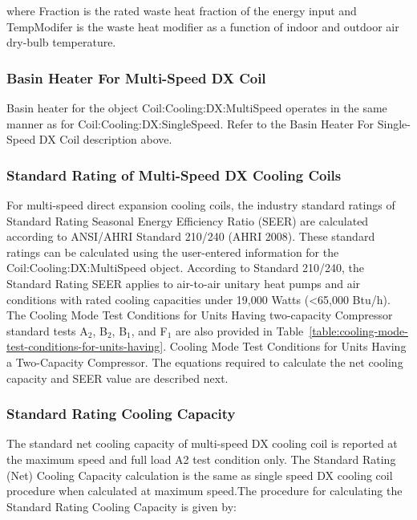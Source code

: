where Fraction is the rated waste heat fraction of the energy input and TempModifer is the waste heat modifier as a function of indoor and outdoor air dry-bulb temperature.

\subsubsection{Basin Heater For Multi-Speed DX Coil}\label{basin-heater-for-multi-speed-dx-coil}

Basin heater for the object Coil:Cooling:DX:MultiSpeed operates in the same manner as for Coil:Cooling:DX:SingleSpeed. Refer to the Basin Heater For Single-Speed DX Coil description above.

\subsubsection{Standard Rating of Multi-Speed DX Cooling Coils}\label{standard-rating-of-multi-speed-dx-cooling-coils}

For multi-speed direct expansion cooling coils, the industry standard ratings of Standard Rating Seasonal Energy Efficiency Ratio (SEER) are calculated according to ANSI/AHRI Standard 210/240 (AHRI 2008). These standard ratings can be calculated using the user-entered information for the Coil:Cooling:DX:MultiSpeed object. According to Standard 210/240, the Standard Rating SEER applies to air-to-air unitary heat pumps and air conditions with rated cooling capacities under 19,000 Watts (\textless{}65,000 Btu/h). The Cooling Mode Test Conditions for Units Having two-capacity Compressor standard tests A\(_{2}\), B\(_{2}\), B\(_{1}\), and F\(_{1}\) are also provided in Table~\ref{table:cooling-mode-test-conditions-for-units-having}. Cooling Mode Test Conditions for Units Having a Two-Capacity Compressor. The equations required to calculate the net cooling capacity and SEER value are described next.

\subsubsection{Standard Rating Cooling Capacity}\label{standard-rating-cooling-capacity}

The standard net cooling capacity of multi-speed DX cooling coil is reported at the maximum speed and full load A2 test condition only. The Standard Rating (Net) Cooling Capacity calculation is the same as single speed DX cooling coil procedure when calculated at maximum speed.The procedure for calculating the Standard Rating Cooling Capacity is given by:

